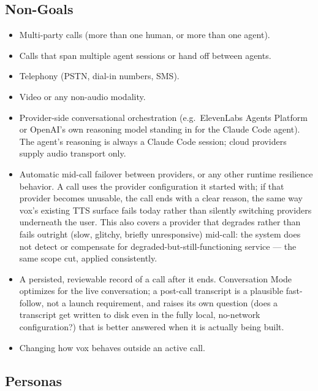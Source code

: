 \documentclass[a4paper,11pt]{report}
\begin{document}
\subsection{Non-Goals}

\begin{itemize}
  \item Multi-party calls (more than one human, or more than one agent).
  \item Calls that span multiple agent sessions or hand off between agents.
  \item Telephony (PSTN, dial-in numbers, SMS).
  \item Video or any non-audio modality.
  \item Provider-side conversational orchestration (e.g.\ ElevenLabs Agents
    Platform or OpenAI's own reasoning model standing in for the Claude Code
    agent). The agent's reasoning is always a Claude Code session; cloud
    providers supply audio transport only.
  \item Automatic mid-call failover between providers, or any other
    runtime resilience behavior. A call uses the provider configuration
    it started with; if that provider becomes unusable, the call ends
    with a clear reason, the same way vox's existing TTS surface fails
    today rather than silently switching providers underneath the user.
    This also covers a provider that degrades rather than fails outright
    (slow, glitchy, briefly unresponsive) mid-call: the system does not
    detect or compensate for degraded-but-still-functioning service ---
    the same scope cut, applied consistently.
  \item A persisted, reviewable record of a call after it ends. Conversation
    Mode optimizes for the live conversation; a post-call transcript is a
    plausible fast-follow, not a launch requirement, and raises its own
    question (does a transcript get written to disk even in the fully
    local, no-network configuration?) that is better answered when it is
    actually being built.
  \item Changing how vox behaves outside an active call.
\end{itemize}

\subsection{Personas}
\end{document}
